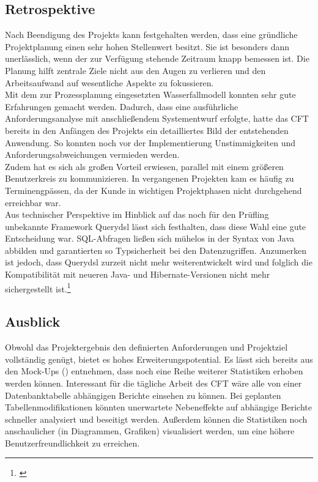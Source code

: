\subsection{Retrospektive}
\label{sec:Retrospektive}
Nach Beendigung des Projekts kann festgehalten werden, dass eine gründliche Projektplanung einen sehr hohen Stellenwert besitzt. Sie ist besonders dann unerlässlich, wenn der zur Verfügung stehende Zeitraum knapp bemessen ist. Die Planung hilft zentrale Ziele nicht aus den Augen zu verlieren und den Arbeitsaufwand auf wesentliche Aspekte zu fokussieren. \\
Mit dem zur Prozessplanung eingesetzten Wasserfallmodell konnten sehr gute Erfahrungen gemacht werden. Dadurch, dass eine ausführliche Anforderungsanalyse mit anschließendem Systementwurf erfolgte, hatte das \ac{CFT} \teamName bereits in den Anfängen des Projekts ein detailliertes Bild der entstehenden Anwendung. So konnten noch vor der Implementierung Unstimmigkeiten und Anforderungsabweichungen vermieden werden. \\
Zudem hat es sich als großen Vorteil erwiesen, parallel mit einem größeren Benutzerkreis zu kommunizieren. In vergangenen Projekten kam es häufig zu Terminengpässen, da der Kunde in wichtigen Projektphasen nicht durchgehend erreichbar war. \\
Aus technischer Perspektive im Hinblick auf das noch für den Prüfling unbekannte Framework Querydsl lässt sich festhalten, dass diese Wahl eine gute Entscheidung war. SQL-Abfragen ließen sich mühelos in der Syntax von Java abbilden und garantierten so Typsicherheit bei den Datenzugriffen. Anzumerken ist jedoch, dass Querydsl zurzeit nicht mehr weiterentwickelt wird und folglich die Kompatibilität mit neueren Java- und Hibernate-Versionen nicht mehr sichergestellt ist.\footnote{\cite{github:qdsl}}

\subsection{Ausblick}
\label{sec:Ausblick}
Obwohl das Projektergebnis den definierten Anforderungen und Projektziel vollständig genügt, bietet es hohes Erweiterungspotential. Es lässt sich bereits aus den Mock-Ups () entnehmen, dass noch eine Reihe weiterer Statistiken erhoben werden können. Interessant für die tägliche Arbeit des \ac{CFT} \teamName wäre \zB alle von einer Datenbanktabelle abhängigen Berichte einsehen zu können. Bei geplanten Tabellenmodifikationen könnten unerwartete Nebeneffekte auf abhängige Berichte schneller analysiert und beseitigt werden.  Außerdem können die Statistiken noch anschaulicher (\zB in Diagrammen, Grafiken) visualisiert werden, um eine höhere Benutzerfreundlichkeit zu erreichen.